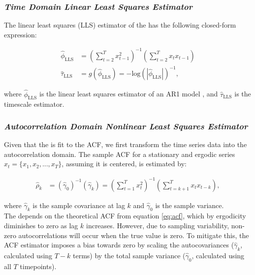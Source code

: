 \documentclass[main.tex]{subfiles}
\begin{document}
\subsubsection{\normalfont\textit{Time Domain Linear Least Squares Estimator}}
The linear least squares (LLS) estimator of the  has the following closed-form expression:

\begin{align}
    \hat\phi_{\scriptscriptstyle\text{LLS}} &= (\sum_{t=2}^T x_{t-1}^2)^{-1} (\sum_{t=2}^T x_t x_{t-1})\\
    \hat\tau_{\scriptscriptstyle\text{LLS}} &= g(\hat\phi_{\scriptscriptstyle\text{LLS}}) = - {\text{log}(|\hat\phi_{\scriptscriptstyle\text{LLS}}|)}^{-1},
\end{align}

\noindent where $\hat\phi_{\scriptscriptstyle\text{LLS}}$ is the linear least squares estimator of an AR1 model \citep[chapter~14.3]{hansen_econometrics_2022}, and $\hat\tau_{\scriptscriptstyle\text{LLS}}$ is the timescale estimator.\\


\subsubsection{\normalfont\textit{Autocorrelation Domain Nonlinear Least Squares Estimator}}

Given that the  is fit to the ACF, we first transform the time series data into the autocorrelation domain. The sample ACF for a stationary and ergodic series $x_t = \{x_1, x_2, ..., x_T\}$, assuming it is centered, is estimated by:

\begin{align}\label{eq:acf_}
    \hat\rho_k &= (\hat\gamma_0)^{-1}(\hat\gamma_k) = (\sum_{t=1}^T x_t^2)^{-1} (\sum_{t=k+1}^{T}x_t x_{t-k}),
\end{align}

\noindent where $\hat\gamma_k$ is the sample covariance at lag $k$ and $\hat\gamma_0$ is the sample variance.\\


The  depends on the theoretical ACF from equation \eqref{eq:acf}, which by ergodicity diminishes to zero as lag $k$ increases. However, due to sampling variability, non-zero autocorrelations will occur when the true value is zero. To mitigate this, the ACF estimator imposes a bias towards zero by scaling the autocovariances ($\hat \gamma_k$, calculated using $T-k$ terms) by the total sample variance ($\hat\gamma_0$, calculated using all $T$ timepoints). \\
\end{document}
